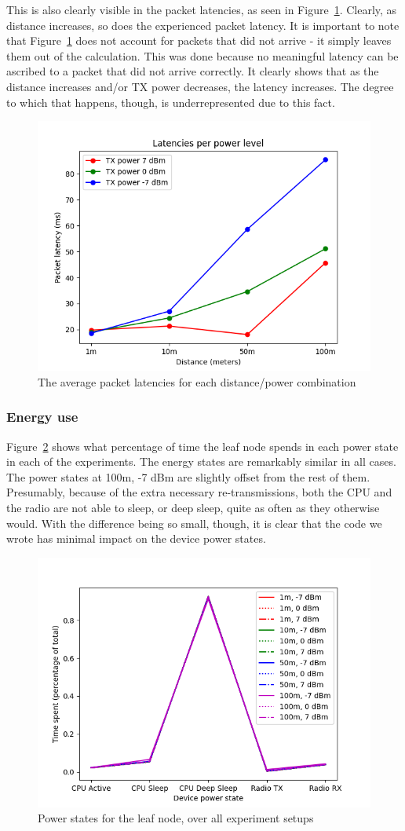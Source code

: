 \documentclass[conference]{IEEEtran}
\newcommand{\figref}[1]{Figure~\ref{#1}}
\renewcommand\_{\textunderscore\allowbreak}
\begin{document}
This is also clearly visible in the packet latencies, as seen in \figref{fig:averagelatencies}. Clearly, as distance increases, so does the experienced packet latency. It is important to note that \figref{fig:averagelatencies} does not account for packets that did not arrive - it simply leaves them out of the calculation. This was done because no meaningful latency can be ascribed to a packet that did not arrive correctly. It clearly shows that as the distance increases and/or TX power decreases, the latency increases. The degree to which that happens, though, is underrepresented due to this fact.

\begin{figure}[htbp]
	\centering
	\includegraphics[width=.48\textwidth,keepaspectratio]{figures/latencies}
	\caption{The average packet latencies for each distance/power combination}
	\label{fig:averagelatencies}
\end{figure}

\subsubsection{Energy use}

\figref{fig:leaf_allstates} shows what percentage of time the leaf node spends in each power state in each of the experiments. The energy states are remarkably similar in all cases. The power states at 100m, -7 dBm are slightly offset from the rest of them. Presumably, because of the extra necessary re-transmissions, both the CPU and the radio are not able to sleep, or deep sleep, quite as often as they otherwise would. With the difference being so small, though, it is clear that the code we wrote has minimal impact on the device power states. 

\begin{figure}[htbp]
	\centering
	\includegraphics[width=.48\textwidth,keepaspectratio]{figures/leaf_allstates}
	\caption{Power states for the leaf node, over all experiment setups}
	\label{fig:leaf_allstates}
\end{figure}
\end{document}
